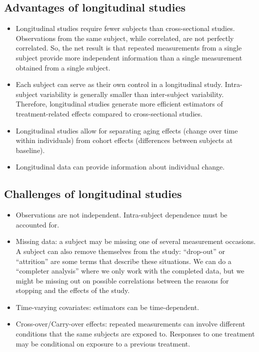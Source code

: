\documentclass{article}
\theoremstyle{definition}
\begin{document}
\subsection{Advantages of longitudinal studies}
\begin{itemize}
	\item Longitudinal studies require fewer subjects than cross-sectional studies. Observations from the same subject, while correlated, are not perfectly correlated. So, the net result is that repeated measurements from a single subject provide more independent information than a single measurement obtained from a single subject.
	\item Each subject can serve as their own control in a longitudinal study. Intra-subject variability is generally smaller than inter-subject variability. Therefore, longitudinal studies generate more efficient estimators of treatment-related effects compared to cross-sectional studies. 
	\item Longitudinal studies allow for separating aging effects (change over time within individuals) from cohort effects (differences between subjects at baseline).
	\item Longitudinal data can provide information about individual change. 
\end{itemize}



\subsection{Challenges of longitudinal studies}

\begin{itemize}
	\item Observations are not independent. Intra-subject dependence must be accounted for.
	\item Missing data: a subject may be missing one of several measurement occasions. A subject can also remove themselves from the study: ``drop-out'' or ``attrition'' are some terms that describe these situations. We can do a ``completer analysis'' where we only work with the completed data, but we might be missing out on possible correlations between the reasons for stopping and the effects of the study.
	\item Time-varying covariates: estimators can be time-dependent. 
	\item Cross-over/Carry-over effects: repeated measurements can involve different conditions that the same subjects are exposed to. Responses to one treatment may be conditional on exposure to a previous treatment. 
\end{itemize}
\end{document}

